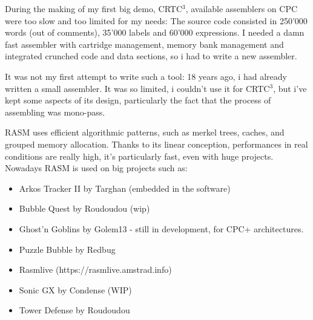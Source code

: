 \begin{xen}
During the making of my first big demo, CRTC$^3$, available assemblers on CPC were too slow and too limited for my needs: The source code consisted in 250'000 words (out of comments), 35'000 labels and 60'000 expressions. I needed a damn fast assembler with cartridge management, memory bank management and integrated crunched code and data sections, so i had to write a new assembler.

It was not my first attempt to write such a tool: 18 years ago, i had already written a small assembler. It was so limited, i couldn't use it for CRTC$^3$, but i've kept some aspects of its design, particularly the fact that the process of assembling was mono-pass.

RASM uses efficient algorithmic patterns, such as merkel trees, caches, and grouped memory allocation.
Thanks to its linear conception, performances in real conditions are really high, it's particularly fast, even with huge projects.
\medskip
Nowadays RASM is used on big projects such as:
\begin{itemize}[noitemsep]
\item Arkos Tracker II by Targhan (embedded in the software) %
\item Bubble Quest by Roudoudou (wip)
\item Ghost'n Goblins by Golem13 - still in development, for CPC+ architectures.
\item Puzzle Bubble by Redbug
\item Rasmlive (https://rasmlive.amstrad.info)
\item Sonic GX by Condense (WIP)
\item Tower Defense by Roudoudou
\end{itemize}

\end{xen}

\subsection{}

